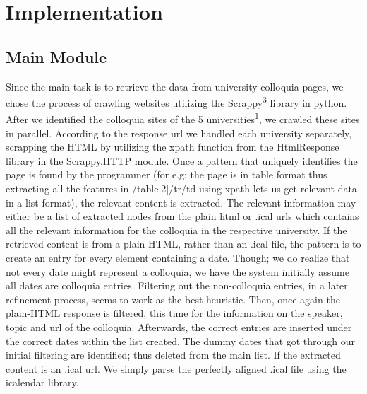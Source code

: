 \documentclass[a4paper,11pt]{article}
\begin{document}
\section{Implementation}
\subsection{Main Module}
\begin{multicols}{2}
Since the main task is to retrieve the data from university colloquia pages, we chose the process of crawling websites utilizing the Scrappy\textsuperscript{3} library in python. After we identified the colloquia sites of the 5 universities\textsuperscript{1}, we crawled these sites in parallel. According to the response url we handled each university separately, scrapping the HTML by utilizing the xpath function from the HtmlResponse library in the Scrappy.HTTP module. Once a pattern that uniquely identifies the page is found by the programmer (for e.g; the page is in table format thus extracting all the features in /table[2]/tr/td using xpath lets us get relevant data in a list format), the relevant content is extracted. The relevant information may either be a list of extracted nodes from the plain html or .ical urls which contains all the relevant information for the colloquia in the respective university. If the retrieved content is from a plain HTML, rather than an .ical file, the pattern is to create an entry for every element containing a date. Though; we do realize that not every date might represent a colloquia, we have the system initially assume all dates are colloquia entries. Filtering out the non-colloquia entries, in a later refinement-process, seems to work as the best heuristic. Then, once again the plain-HTML response is filtered, this time for the information on the speaker, topic and url of the colloquia. Afterwards, the correct entries are inserted under the correct dates within the list created. The dummy dates that got through our initial filtering are identified; thus deleted from the main list. If the extracted content is an .ical url. We simply parse the perfectly aligned .ical file using the icalendar library. 
\end{multicols}
\end{document}
